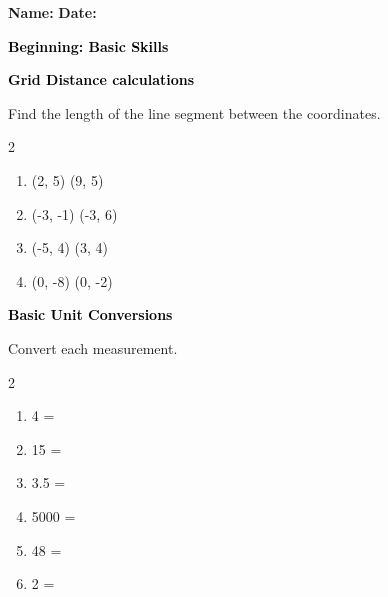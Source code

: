 \documentclass[12pt, letterpaper, fleqn]{article}
\newcommand{\blank}{\underline{\hspace{2.2cm}}}
\begin{document}
\textbf{Name:} \underline{\hspace{5cm}}
\hfill
\textbf{Date:} \underline{\hspace{3cm}}\\

\begin{tcolorbox}[colback=customteal!20]
    \large\textcolor{black}{\textbf{Beginning: Basic Skills}}
\end{tcolorbox}

\vspace{3mm}

\begin{tcolorbox}[colback=customteal!20]
\large\textcolor{black}{\textbf{Grid Distance calculations}}
\end{tcolorbox}

\noindent
Find the length of the line segment between the coordinates.

\vspace{3mm}
\begin{multicols}{2}
\begin{enumerate}[itemsep=1cm, leftmargin=0.6cm]
\item (2, 5)  (9, 5) \quad \rightarrow \quad \blank
\item (-3, -1)  (-3, 6) \quad \rightarrow \quad \blank
\item (-5, 4)  (3, 4) \quad \rightarrow \quad \blank
\item (0, -8)  (0, -2) \quad \rightarrow \quad \blank
\end{enumerate}
\end{multicols}
\newpage

\begin{tcolorbox}[colback=customteal!20]
\large\textcolor{black}{\textbf{Basic Unit Conversions}}
\end{tcolorbox}

\noindent
Convert each measurement.

\vspace{3mm}
\begin{multicols}{2}
\begin{enumerate}[itemsep=1cm, leftmargin=0.6cm]
\item 4 = \blank{}
\item 15 = \blank{}
\item 3.5 = \blank{}
\item 5000 = \blank{}
\item 48 = \blank{}
\item 2 = \blank{}
\end{enumerate}
\end{multicols}
\newpage
\end{document}

